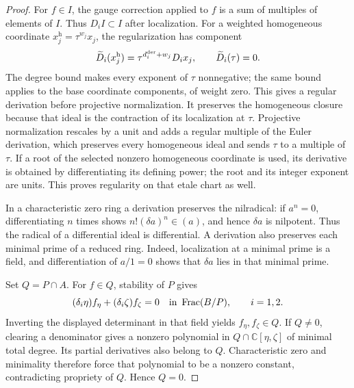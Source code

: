 \documentclass[11pt,a4paper]{article}
\numberwithin{equation}{section}
\theoremstyle{plain}
\theoremstyle{definition}
\theoremstyle{remark}
\begin{document}
\begin{proof}
For $f\in I$, the gauge correction applied to $f$ is a sum of
multiples of elements of $I$. Thus $D_iI\subset I$ after localization.
For a weighted homogeneous coordinate $x_j^{\mathrm h}=\tau^{w_j}x_j$,
the regularization has component
\[
 \widetilde D_i(x_j^{\mathrm h})
   =\tau^{d_i^{\rm der}+w_j}D_ix_j,\qquad
 \widetilde D_i(\tau)=0.
\]
The degree bound makes every exponent of $\tau$ nonnegative; the same
bound applies to the base coordinate components, of weight zero.
This gives a regular derivation before projective normalization.
It preserves the homogeneous closure because that ideal is the
contraction of its localization at $\tau$. Projective normalization
rescales by a unit and adds a regular multiple of the Euler derivation, which preserves
every homogeneous ideal and sends $\tau$ to a multiple of $\tau$.
If a root of the selected nonzero homogeneous coordinate is used,
its derivative is obtained by differentiating its defining power;
the root and its integer exponent are units. This proves regularity
on that etale chart as well. 

In a characteristic zero ring a derivation preserves the nilradical:
if $a^n=0$, differentiating $n$ times shows
$n!(\delta a)^n\in(a)$, and hence $\delta a$ is nilpotent.
Thus the radical of a differential ideal is differential. A
derivation also preserves each minimal prime of a reduced ring.
Indeed, localization at a minimal prime is a field, and differentiation
of $a/1=0$ shows that $\delta a$ lies in that minimal prime.

Set $Q=P\cap A$. For $f\in Q$, stability of $P$ gives
\[
 (\delta_i\eta )f_\eta +(\delta_i\zeta )f_\zeta =0
 \quad\hbox{in }\operatorname{Frac}(B/P),\qquad i=1,2.
\]
Inverting the displayed determinant in that field yields
$f_\eta ,f_\zeta \in Q$. If $Q\ne0$, clearing a denominator gives a nonzero
polynomial in $Q\cap\mathbb C[\eta ,\zeta ]$ of minimal total degree.
Its partial derivatives also belong to $Q$. Characteristic zero and
minimality therefore force that polynomial to be a nonzero constant,
contradicting propriety of $Q$. Hence $Q=0$.
\end{proof}
\end{document}
